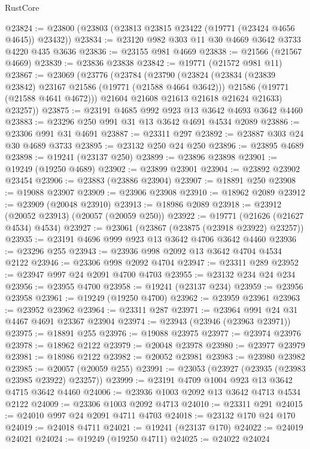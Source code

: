 \begin{lexlean}{RustCore}
\begin{coremodule}
@23824 := @23800 (@23803 (@23813 @23815 @23422 (@19771 (@23424 @4656 @4645)) @23432))
@23834 := @23120 @982 @303 @11 @30 @4669 @3642 @3733 @4220 @435 @3636
@23836 := @23155 @981 @4669
@23838 := @21566 (@21567 @4669)
@23839 := @23836 @23838
@23842 := @19771 (@21572 @981 @11)
@23867 := @23069
    (@23776
      (@23784
        (@23790
          (@23824
            (@23834 (@23839 @23842) @23167 @21586 (@19771 (@21588 @4664 @3642)))
            @21586
            (@19771 (@21588 @4641 @4672)))
          @21604
          @21608
          @21613
          @21618
          @21624
          @21633)
        @23257))
@23875 := @23191 @4685 @992 @923 @13 @3642 @4693 @3642 @4460
@23883 := @23296 @250 @991 @31 @13 @3642 @4691 @4534 @2089
@23886 := @23306 @991 @31 @4691
@23887 := @23311 @297
@23892 := @23887 @303 @24 @30 @4689 @3733
@23895 := @23132 @250 @24 @250
@23896 := @23895 @4689
@23898 := @19241 (@23137 @250)
@23899 := @23896 @23898
@23901 := @19249 (@19250 @4689)
@23902 := @23899 @23901
@23904 := @23892 @23902 @23454
@23906 := @23883 (@23886 @23904)
@23907 := @18891 @250
@23908 := @19088 @23907
@23909 := @23906 @23908
@23910 := @18962 @2089
@23912 := @23909 (@20048 @23910)
@23913 := @18986 @2089
@23918 := @23912 (@20052 @23913) (@20057 (@20059 @250))
@23922 := @19771 (@21626 (@21627 @4534) @4534)
@23927 := @23061 (@23867 (@23875 (@23918 @23922) @23257))
@23935 := @23191 @4696 @999 @923 @13 @3642 @4706 @3642 @4460
@23936 := @23296 @255
@23943 := @23936 @998 @2092 @13 @3642 @4704 @4534 @2122
@23946 := @23306 @998 @2092 @4704
@23947 := @23311 @289
@23952 := @23947 @997 @24 @2091 @4700 @4703
@23955 := @23132 @234 @24 @234
@23956 := @23955 @4700
@23958 := @19241 (@23137 @234)
@23959 := @23956 @23958
@23961 := @19249 (@19250 @4700)
@23962 := @23959 @23961
@23963 := @23952 @23962
@23964 := @23311 @287
@23971 := @23964 @991 @24 @31 @4467 @4691 @23367 @23904
@23974 := @23943 (@23946 (@23963 @23971))
@23975 := @18891 @255
@23976 := @19088 @23975
@23977 := @23974 @23976
@23978 := @18962 @2122
@23979 := @20048 @23978
@23980 := @23977 @23979
@23981 := @18986 @2122
@23982 := @20052 @23981
@23983 := @23980 @23982
@23985 := @20057 (@20059 @255)
@23991 := @23053 (@23927 (@23935 (@23983 @23985 @23922) @23257))
@23999 := @23191 @4709 @1004 @923 @13 @3642 @4715 @3642 @4460
@24006 := @23936 @1003 @2092 @13 @3642 @4713 @4534 @2122
@24009 := @23306 @1003 @2092 @4713
@24010 := @23311 @291
@24015 := @24010 @997 @24 @2091 @4711 @4703
@24018 := @23132 @170 @24 @170
@24019 := @24018 @4711
@24021 := @19241 (@23137 @170)
@24022 := @24019 @24021
@24024 := @19249 (@19250 @4711)
@24025 := @24022 @24024

\end{coremodule}
\end{lexlean}
